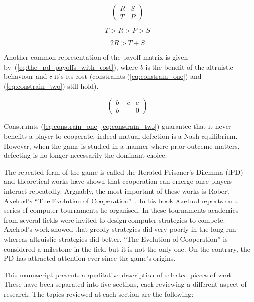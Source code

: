\begin{equation}\label{eq:the_pd_payoffs}
    \begin{pmatrix}
    R & S \\ T & P
    \end{pmatrix}
\end{equation}

\begin{equation}\label{eq:constrain_one}
    T > R > P > S
\end{equation}

\begin{equation}\label{eq:constrain_two}
    2R > T + S
\end{equation}

Another common representation of the payoff matrix is given by~(\ref{eq:the_pd_payoffs_with_cost}),
where \(b\) is the benefit of the altruistic behaviour and \(c\) it's its cost
(constraints (\ref{eq:constrain_one}) and (\ref{eq:constrain_two}) still hold).

\begin{equation}\label{eq:the_pd_payoffs_with_cost}
    \begin{pmatrix}
        b - c & c \\ b & 0
    \end{pmatrix}
\end{equation}

Constraints (\ref{eq:constrain_one}-\ref{eq:constrain_two})
guarantee that it never benefits a player to cooperate, indeed mutual
defection is a Nash equilibrium. However, when the game is studied in a manner
where prior outcome matters, defecting is no longer necessarily the dominant
choice.

The repeated form of the game is called the Iterated Prisoner's Dilemma (IPD)
and theoretical works have shown that cooperation can emerge once players
interact repeatedly. Arguably, the most important of these works is Robert
Axelrod's ``The Evolution of Cooperation''~\cite{Axelrod1984}. In his book
Axelrod reports on a series of computer tournaments he organised. In these
tournaments academics from several fields were invited to design computer
strategies to compete. Axelrod's work showed that greedy
strategies did very poorly in the long run whereas altruistic strategies did
better. ``The Evolution of Cooperation'' is considered a milestone in the field
but it is not the only one. On the contrary, the PD has attracted attention ever
since the game's origins.

This manuscript presents a qualitative description of selected pieces
of work. These have been separated into five sections, each
reviewing a different aspect of research. The topics reviewed at each section
are the following:

